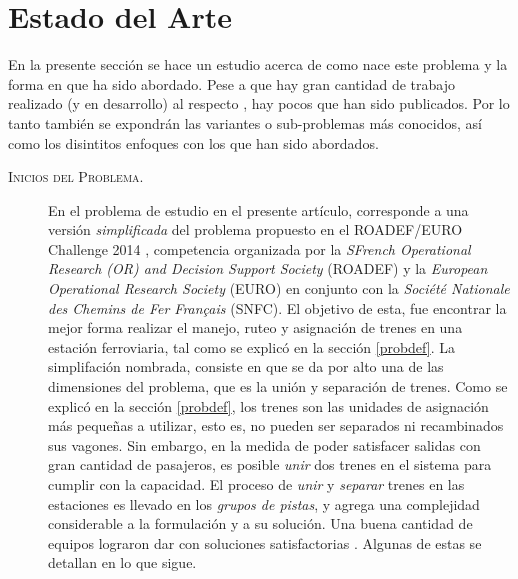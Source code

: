 \documentclass[letter, 10pt]{article}
\begin{document}
\section{Estado del Arte} \label{SoA}
En la presente sección se hace un estudio acerca de como nace este problema y la forma en que ha sido abordado. Pese a que  hay gran cantidad de trabajo realizado (y en desarrollo) al respecto \cite{RoadefResults}, hay pocos que han sido publicados. Por lo tanto también se expondrán las variantes o sub-problemas más conocidos, así como los disintitos enfoques con los que han sido abordados.

\begin{description}
	\item[\textsc{Inicios del Problema.}] En el problema de estudio en el presente artículo, corresponde a una versión \textit{simplificada} del problema propuesto en el ROADEF/EURO Challenge 2014 \cite{Problem}, competencia organizada
	por la \textit{SFrench Operational Research (OR) and Decision Support Society} (ROADEF) y la \textit{European Operational Research Society} (EURO) en conjunto con la \textit{Société Nationale des Chemins de Fer Français} (SNFC).
	El objetivo de esta, fue encontrar la mejor forma realizar el manejo, ruteo y asignación de trenes en una estación ferroviaria, tal como se explicó en la sección \ref{probdef}. La simplifación nombrada, consiste en que se da por alto una de las dimensiones del problema, que es la unión y separación de trenes. Como se explicó en la sección \ref{probdef},
	los trenes son las unidades de asignación más pequeñas a utilizar, esto es, no pueden ser separados ni recambinados sus vagones. Sin embargo, en la medida de poder satisfacer salidas con gran cantidad de pasajeros, es posible \textit{unir} 
	dos trenes en el sistema para cumplir con la capacidad. El proceso de \textit{unir} y \textit{separar} trenes en las estaciones es llevado en los \textit{grupos de pistas}, y agrega una complejidad considerable a la formulación y a su solución.
	Una buena cantidad de equipos lograron dar con soluciones satisfactorias \cite{RoadefResults}. Algunas de estas se detallan en lo que sigue.


\end{description}
\end{document}
